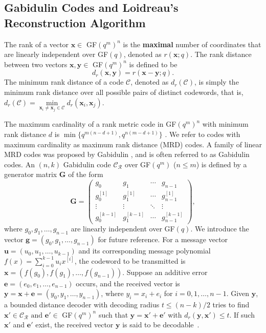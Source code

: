 \documentclass[11pt,onecolumn,draftcls]{IEEEtran}
\begin{document}
\subsection{Gabidulin Codes and Loidreau's Reconstruction Algorithm}\label{sec: GB}
The rank of a vector $\mathbf{x} \in$ GF$(q^m)^n$ is the \textbf{maximal} number of coordinates that are linearly independent over GF$(q)$, denoted as $r(\mathbf{x}; q)$. The rank distance between two vectors $\mathbf{x, y} \in$ GF$(q^m)^n$ is defined to be
\begin{equation}
d_r(\mathbf{x}, \mathbf{y}) = r(\mathbf{x-y}; q).
\end{equation}
The minimum rank distance of a code $\mathcal{C}$, denoted as  $d_r(\mathcal{C})$, is simply the minimum rank distance
over all possible pairs of distinct codewords, that is, $d_r(\mathcal{C}) = \min\limits_{\mathbf{x}_i \neq \mathbf{x}_j\in \mathcal{C}} d_r(\mathbf{x}_i, \mathbf{x}_j)$.


The maximum cardinality of a rank metric code in GF$(q^m)^n$ with minimum rank distance $d$ is $\min\{q^{m(n-d+1)}, q^{n(m-d+1)}\}$ \cite{delsarte_jct78, gabidulin_pit0185, roth_it91}. We refer to codes with maximum cardinality as maximum rank distance (MRD) codes.
A family of linear MRD codes was proposed by Gabidulin \cite{gabidulin_pit0185}, and is often referred to as Gabidulin codes.
An $(n, k)$ Gabidulin code $\mathcal{C_R}$ over GF$(q^m)$ ($n \le m$) is defined by a generator matrix $\mathbf{G}$ of the form
\begin{equation} \label{equ: Ggenematrix}
\mathbf{G} = \left( \begin{array}{cccc}
g_0   &   g_1   &  \cdots  & g_{n-1} \\
g_0^{[1]}   & g_1^{[1]}   &   \cdots   &  g_{n-1}^{[1]} \\
\vdots   &   \vdots   & \ddots  &   \vdots \\
g_0^{[k-1]}  &  g_1^{[k-1]}  &  \cdots  & g_{n-1}^{[k-1]}
\end{array} \right),
\end{equation}
where $g_0, g_1, \ldots, g_{n-1}$ are linearly independent over GF$(q)$. We introduce the vector $\mathbf{g} = (g_0, g_1, \ldots, g_{n-1})$ for future reference. For a message vector $\mathbf{u} = (u_0, u_1, \ldots, u_{k-1})$ and its corresponding message polynomial $f(x) = \sum_{i = 0}^{k-1} u_i x^{[i]}$, the codeword to be transmitted is $\mathbf{x} = (f(g_0), f(g_1), \ldots, f(g_{n-1}))$. Suppose an additive error $\mathbf{e} = (e_0, e_1, \ldots, e_{n-1})$ occurs, and the received vector is $\mathbf{y} = \mathbf{x} + \mathbf{e}= (y_0, y_1, \ldots, y_{n-1})$, where $y_i = x_i + e_i$ for $i = 0, 1, \ldots, n-1$. Given $\mathbf{y}$, a bounded distance decoder with decoding radius $t \le (n-k)/2$ tries to find $\mathbf{x'} \in \mathcal{C_R} \textrm{ and } \mathbf{e'} \in$ GF$(q^m)^n$ such that $\mathbf{y} = \mathbf{x'} + \mathbf{e'}$ with $d_r(\mathbf{y}, \mathbf{x'}) \le t$. If such $\mathbf{x'}$ and $\mathbf{e'}$ exist, the received vector $\mathbf{y}$ is said to be decodable~\cite{gabidulin_pit0185}.
\end{document}
